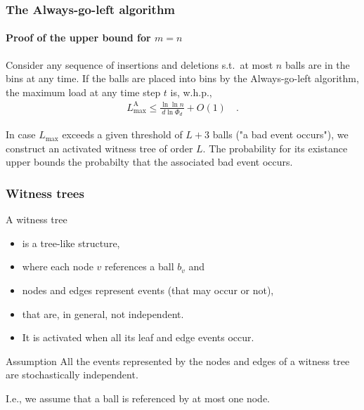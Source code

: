 \documentclass[serif,professionalfonts]{beamer}
\newcommand\load{L_{\mathrm{max}}}
\newcommand\loadAgl{\load^{\mathrm{A}}}
\begin{document}
\begin{frame}
\frametitle{The Always-go-left algorithm}
\framesubtitle{Proof of the upper bound for $m=n$}
\begin{theorem}[V\"ocking, 2003]
\label{theorem:aglm}
Consider any sequence of insertions and deletions s.t.~at most $n$ balls are in the bins at any time. If the balls are placed into bins by the Always-go-left algorithm, the maximum load at any time step $t$ is, w.h.p., 
\begin{align*}
\loadAgl \leq \frac{\ln\ln n}{d  \ln \Phi_d} + O(1) \quad .
\end{align*}
\end{theorem}

\bigskip
In case $\load$ exceeds a given threshold of $L+3$ balls ("a bad event occurs"), we construct an activated \alert{witness tree of order $L$}. The probability for its existance upper bounds the probabilty that the associated bad event occurs.  
\end{frame}


\newcommand\assumptionOne{
\begin{alertblock}{Assumption}
All the events represented by the nodes and edges of a witness tree are stochastically independent. 
\end{alertblock}
}


\begin{frame}
\frametitle{Witness trees}
A witness tree
\begin{itemize}
\item is a \alert{tree-like structure},
\item where each node $v$ references a ball $b_v$ and
\item nodes and edges represent \alert{events} (that may occur or not),
\item that are, in general, \alert{not independent}.
\item It is \alert{activated} when all its leaf and edge events occur. 
\end{itemize}

\bigskip

\assumptionOne

I.e., we assume that a ball is referenced by at most one node.
\end{frame}
\end{document}
